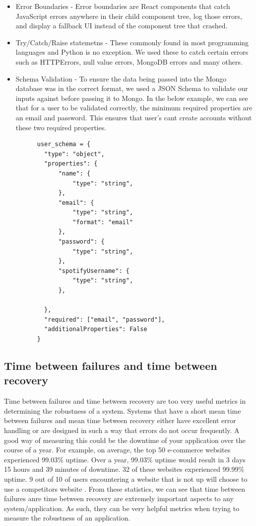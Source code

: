     \begin{itemize}
      \item Error Boundaries - Error boundaries are React components that catch JavaScript errors anywhere in their child component tree, log those errors, and display a fallback UI instead of the component tree that crashed.
      \item Try/Catch/Raise statemetns - These commonly found in most programming languages and Python is no exception. We used these to catch certain errors such as HTTPErrors, null value errors, MongoDB errors and many others.
      \item Schema Validation - To ensure the data being passed into the Mongo database was in the correct format, we used a JSON Schema to validate our inputs against before passing it to Mongo. In the below example, we can see that for a user 
      to be validated correctly, the minimum required properties are an email and password. This ensures that user's cant create accounts without these two required properties.
      \begin{verbatim}
      user_schema = {
        "type": "object",
        "properties": {
            "name": {
                "type": "string",
            },
            "email": {
                "type": "string",
                "format": "email"
            },
            "password": {
                "type": "string",
            },
            "spotifyUsername": {
                "type": "string",
            },
          
        },
        "required": ["email", "password"],
        "additionalProperties": False
      }
      \end{verbatim}
      
    \end{itemize}

    \subsection{Time between failures and time between recovery}
    Time between failures and time between recovery are too very useful metrics in determining the robustness of a system. Systems that have a short mean time between failures and mean time between recovery
    either have excellent error handling or are designed in such a way that errors do not occur frequently. A good way of measuring this could be 
    the downtime of your application over the course of a year. For example, on average, the top 50 e-commerce websites experienced 99.03\% uptime. Over a year, 99.03\% uptime would result in 3 days 15 hours and 39 minutes of downtime. 32 of
    these websites experienced 99.99\% uptime. 9 out of 10 of users encountering a website that is not up will choose to use a competitors website \cite{WebsiteDowntimeStats}. From these statistics, we can see that time between failures anre time between recovery are extremely important aspects to 
    any system/application. As such, they can be very helpful metrics when trying to measure the robustness of an application. 


